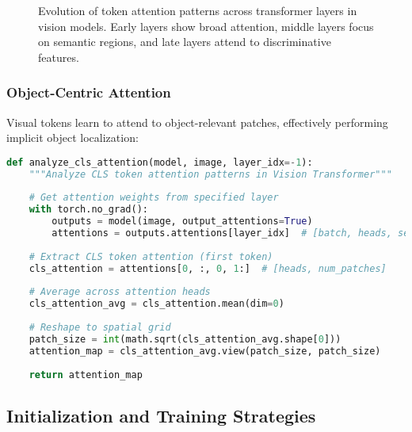 \begin{figure}[htbp]
{
}%
\caption{Evolution of \cls{} token attention patterns across transformer layers in vision models. Early layers show broad attention, middle layers focus on semantic regions, and late layers attend to discriminative features.}
\end{figure}

\subsubsection{Object-Centric Attention}

Visual \cls{} tokens learn to attend to object-relevant patches, effectively performing implicit object localization:

\begin{lstlisting}[language=Python, caption=Analyzing CLS attention patterns in ViT]
def analyze_cls_attention(model, image, layer_idx=-1):
    """Analyze CLS token attention patterns in Vision Transformer"""
    
    # Get attention weights from specified layer
    with torch.no_grad():
        outputs = model(image, output_attentions=True)
        attentions = outputs.attentions[layer_idx]  # [batch, heads, seq_len, seq_len]
    
    # Extract CLS token attention (first token)
    cls_attention = attentions[0, :, 0, 1:]  # [heads, num_patches]
    
    # Average across attention heads
    cls_attention_avg = cls_attention.mean(dim=0)
    
    # Reshape to spatial grid
    patch_size = int(math.sqrt(cls_attention_avg.shape[0]))
    attention_map = cls_attention_avg.view(patch_size, patch_size)
    
    return attention_map
\end{lstlisting}

\subsection{Initialization and Training Strategies}

